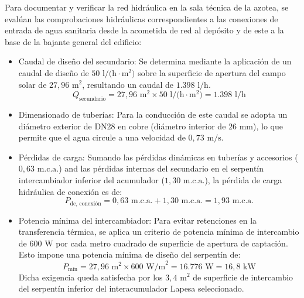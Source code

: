 \documentclass[12pt]{article}
\begin{document}
Para documentar y verificar la red hidráulica en la sala técnica de la azotea, se evalúan las comprobaciones hidráulicas correspondientes a las conexiones de entrada de agua sanitaria desde la acometida de red al depósito y de este a la base de la bajante general del edificio:
\begin{itemize}
    \item Caudal de diseño del secundario: Se determina mediante la aplicación de un caudal de diseño de $50\text{ l/(h}\cdot\text{m}^2)$ sobre la superficie de apertura del campo solar de $27,96\text{ m}^2$, resultando un caudal de $1.398\text{ l/h}$.
    \begin{equation}
        Q_{\text{secundario}} = 27,96\text{ m}^2 \times 50\text{ l/(h}\cdot\text{m}^2) = 1.398\text{ l/h}
    \end{equation}
    \item Dimensionado de tuberías: Para la conducción de este caudal se adopta un diámetro exterior de DN28 en cobre (diámetro interior de $26\text{ mm}$), lo que permite que el agua circule a una velocidad de $0,73\text{ m/s}$.
    \item Pérdidas de carga: Sumando las pérdidas dinámicas en tuberías y accesorios ($0,63\text{ m.c.a.}$) and las pérdidas internas del secundario en el serpentín intercambiador inferior del acumulador ($1,30\text{ m.c.a.}$), la pérdida de carga hidráulica de conexión es de:
    \begin{equation}
        P_{\text{dc, conexión}} = 0,63\text{ m.c.a.} + 1,30\text{ m.c.a.} = 1,93\text{ m.c.a.}
    \end{equation}
    \item Potencia mínima del intercambiador: Para evitar retenciones en la transferencia térmica, se aplica un criterio de potencia mínima de intercambio de $600\text{ W}$ por cada metro cuadrado de superficie de apertura de captación. Esto impone una potencia mínima de diseño del serpentín de:
    \begin{equation}
        P_{\text{mín}} = 27,96\text{ m}^2 \times 600\text{ W/m}^2 = 16.776\text{ W} = 16,8\text{ kW}
    \end{equation}
    Dicha exigencia queda satisfecha por los $3,4\text{ m}^2$ de superficie de intercambio del serpentín inferior del interacumulador Lapesa seleccionado.
\end{itemize}
\end{document}
